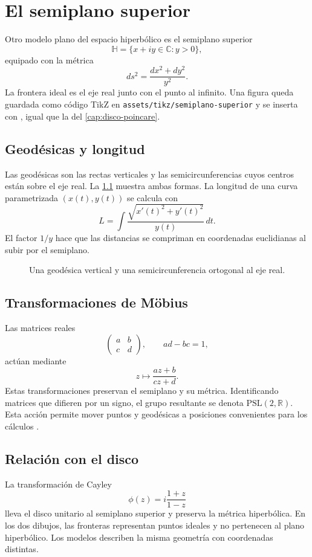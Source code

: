 \chapter{El semiplano superior}
\label{cap:semiplano-superior}

Otro modelo plano del espacio hiperbólico es el semiplano superior
\[
  \mathbb{H}=\{x+iy\in\mathbb{C}:y>0\},
\]
equipado con la métrica
\begin{equation}
  ds^2=\frac{dx^2+dy^2}{y^2}.
  \label{eq:metrica-semiplano}
\end{equation}
La frontera ideal es el eje real junto con el punto al infinito. Una figura queda guardada como código TikZ en \texttt{assets/tikz/semiplano-superior} y se inserta con \verb||, igual que la del \cref{cap:disco-poincare}.

\section{Geodésicas y longitud}

Las geodésicas son las rectas verticales y las semicircunferencias cuyos centros están sobre el eje real. La \cref{fig:semiplano-superior} muestra ambas formas. La longitud de una curva parametrizada \((x(t),y(t))\) se calcula con
\[
  L=\int \frac{\sqrt{x'(t)^2+y'(t)^2}}{y(t)}\,dt.
\]
El factor \(1/y\) hace que las distancias se compriman en coordenadas euclidianas al subir por el semiplano.

\begin{figure}[htbp]
  \centering
  
  \caption{Una geodésica vertical y una semicircunferencia ortogonal al eje real.}
  \label{fig:semiplano-superior}
\end{figure}

\section{Transformaciones de Möbius}

Las matrices reales
\[
  \begin{pmatrix}a&b\\c&d\end{pmatrix},
  \qquad ad-bc=1,
\]
actúan mediante
\[
  z\longmapsto\frac{az+b}{cz+d}.
\]
Estas transformaciones preservan el semiplano y su métrica. Identificando matrices que difieren por un signo, el grupo resultante se denota \(\mathrm{PSL}(2,\mathbb{R})\). Esta acción permite mover puntos y geodésicas a posiciones convenientes para los cálculos \cite{anderson2005}.

\section{Relación con el disco}

La transformación de Cayley
\[
  \phi(z)=i\frac{1+z}{1-z}
\]
lleva el disco unitario al semiplano superior y preserva la métrica hiperbólica. En los dos dibujos, las fronteras representan puntos ideales y no pertenecen al plano hiperbólico. Los modelos describen la misma geometría con coordenadas distintas.
